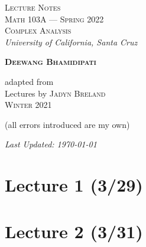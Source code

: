 
 

 
 
\begin{titlepage}
    \centering
    \vspace*{\fill}

	\vspace{-2in}

    {\Huge
    \textsc{Lecture Notes}}\\

    \vspace{0.1in}
	{\Large
	\textsc{Math 103A --- Spring 2022\\[0.5em] Complex Analysis}}\\
	\vspace{0.5in}    
    {\Large
    \textsl{University of California, Santa Cruz}}
	
    \vspace*{0.5in}

	{\LARGE    
    \textbf{\textsc{Deewang Bhamidipati}}}
	
    \vspace*{0.5in}

	{{\large adapted from}\\[0.1em]
	\Large    
    Lectures by
	\textsc{Jadyn Breland}\\[0.1em]
	{\normalsize\textsc{Winter 2021}}

	\vspace*{0.2in}	
	{\large
	(all errors introduced are my own)}
	}

	\vspace*{\fill}
	{\normalsize    
    \textsl{Last Updated: \today}}
    \end{titlepage}
    
\tableofcontents
\pagebreak

\section{Lecture 1 (3/29)}

\newpage

\section{Lecture 2 (3/31)}

\newpage

